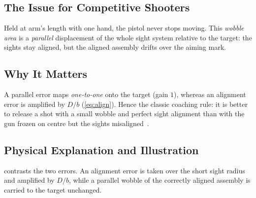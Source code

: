 \documentclass[11pt]{article}
\begin{document}
\subsection{The Issue for Competitive Shooters}

Held at arm's length with one hand, the pistol never stops moving.  This
\emph{wobble area} is a \emph{parallel} displacement of the whole sight
system relative to the target: the sights stay aligned, but the aligned
assembly drifts over the aiming mark.

\subsection{Why It Matters}

A parallel error maps \emph{one-to-one} onto the target (gain $1$), whereas
an alignment error is amplified by $D/b$ (\cref{eq:align}).  Hence the
classic coaching rule: it is better to release a shot with a small wobble
and perfect sight alignment than with the gun frozen on centre but the
sights misaligned~\cite{nra}.

\subsection{Physical Explanation and Illustration}

 contrasts the two errors.  An alignment error is taken
over the short sight radius and amplified by $D/b$, while a parallel wobble
of the correctly aligned assembly is carried to the target unchanged.
\end{document}
